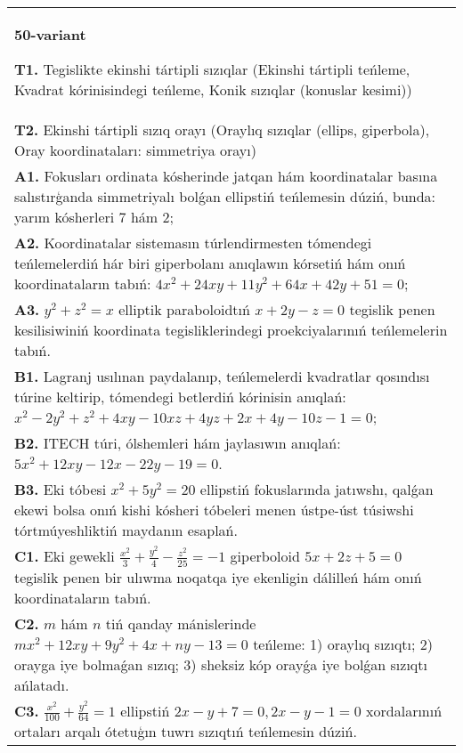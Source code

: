 \documentclass{article}
\begin{document}
\begin{tabular}{m{17cm}}
\textbf{50-variant}
\newline

\textbf{T1.} Tegislikte ekinshi tártipli sızıqlar (Ekinshi tártipli teńleme, Kvadrat kórinisindegi teńleme, Konik sızıqlar (konuslar kesimi)) \\
\textbf{T2.} Ekinshi tártipli sızıq orayı (Oraylıq sızıqlar (ellips, giperbola), Oray koordinataları: simmetriya orayı) \\
\textbf{A1.} Fokusları ordinata kósherinde jatqan hám koordinatalar basına salıstırģanda simmetriyalı bolǵan ellipstiń teńlemesin dúziń, bunda: yarım kósherleri 7 hám 2; \\
\textbf{A2.} Koordinatalar sistemasın túrlendirmesten tómendegi teńlemelerdiń hár biri giperbolanı anıqlawın kórsetiń hám onıń koordinataların tabıń: $4 x^2+24 x y+11 y^2+64 x+42 y+51=0$; \\
\textbf{A3.} $y^2+z^2=x$ elliptik paraboloidtıń $x+2 y-z=0$ tegislik penen kesilisiwiniń koordinata tegisliklerindegi proekciyalarınıń teńlemelerin tabıń. \\
\textbf{B1.} Lagranj usılınan paydalanıp, teńlemelerdi kvadratlar qosındısı túrine keltirip, tómendegi betlerdiń kórinisin anıqlań: $x^2-2 y^2+z^2+4 x y-10 x z+4 y z+2 x+4 y-10 z-1=0$; \\
\textbf{B2.} ITECH túri, ólshemleri hám jaylasıwın anıqlań: $5 x^2+12 x y-12 x-22 y-19=0$. \\
\textbf{B3.} Eki tóbesi $x^2+5 y^2=20$ ellipstiń fokuslarında jatıwshı, qalǵan ekewi bolsa onıń kishi kósheri tóbeleri menen ústpe-úst túsiwshi tórtmúyeshliktiń maydanın esaplań. \\
\textbf{C1.} Eki gewekli $\frac{x^2}{3}+\frac{y^2}{4}-\frac{z^2}{25}=-1$ giperboloid $5 x+2 z+5=0$ tegislik penen bir ulıwma noqatqa iye ekenligin dálilleń hám onıń koordinataların tabıń. \\
\textbf{C2.} $m$ hám $n$ tiń qanday mánislerinde $m x^2+12 x y+9 y^2+4 x+n y-13=0$ teńleme: 1) oraylıq sızıqtı; 2) orayga iye bolmaǵan sızıq; 3) sheksiz kóp orayǵa iye bolǵan sızıqtı ańlatadı. \\
\textbf{C3.} $\frac{x^2}{100}+\frac{y^2}{64}=1$ ellipstiń $2 x-y+7=0,2 x-y-1=0$ xordalarınıń ortaları arqalı ótetuģın tuwrı sızıqtıń teńlemesin dúziń. \\

\end{tabular}
\vspace{1cm}
\end{document}
